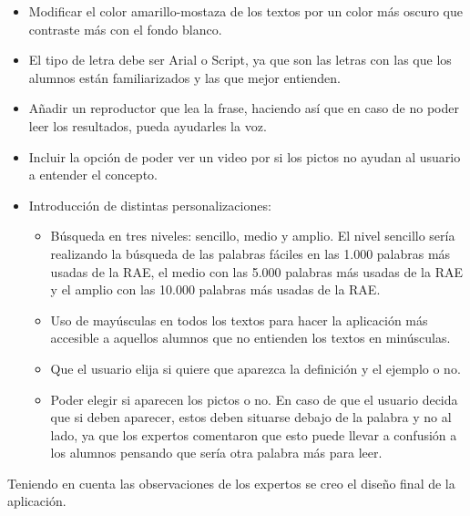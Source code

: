 \begin{itemize} 
	\item Modificar el color amarillo-mostaza de los textos por un color más oscuro que contraste más con el fondo blanco.
	\item El tipo de letra debe ser Arial o Script, ya que son las letras con las que los alumnos están familiarizados y las que mejor entienden.
	\item Añadir un reproductor que lea la frase, haciendo así que en caso de no poder leer los resultados, pueda ayudarles la voz.
	\item Incluir la opción de poder ver un video por si los pictos no ayudan al usuario a entender el concepto.
	\item Introducción de distintas personalizaciones:
	\begin{itemize}
		\item Búsqueda en tres niveles: sencillo, medio y amplio. El nivel sencillo sería realizando la búsqueda de las palabras fáciles en las 1.000 palabras más usadas de la RAE, el medio con las 5.000 palabras más usadas de la RAE y el amplio con las 10.000 palabras más usadas de la RAE. 
		\item Uso de mayúsculas en todos los textos para hacer la aplicación más accesible a aquellos alumnos que no entienden los textos en minúsculas.
		\item Que el usuario elija si quiere que aparezca la definición y el ejemplo o no.
		\item Poder elegir si aparecen los pictos o no. En caso de que el usuario decida que si deben aparecer, estos deben situarse debajo de la palabra y no al lado, ya que los expertos comentaron que esto puede llevar a confusión a los alumnos pensando que sería otra palabra más para leer. 
	\end{itemize}
\end{itemize}

Teniendo en cuenta las observaciones de los expertos se creo el diseño final de la aplicación.

